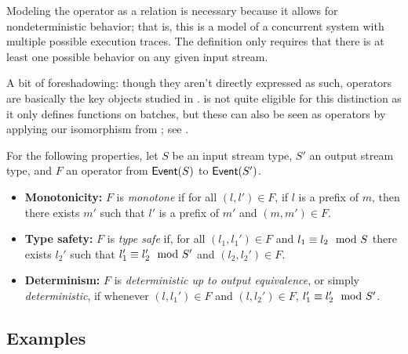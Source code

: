 Modeling the operator as a relation is necessary because it allows for nondeterministic behavior; that is, this is a model of a concurrent system with multiple possible execution traces. The definition only requires that there is at least one possible behavior on any given input stream.

A bit of foreshadowing: though they aren't directly expressed as such, operators are basically the key objects studied in .
 is not quite eligible for this distinction as it only defines functions on batches, but these can also be seen as operators by applying our isomorphism from ; see .

For the following properties, let $S$ be an input stream type, $S'$ an output stream type, and $F$ an operator from $\mathsf{Event}(S)$ to $\mathsf{Event}(S')$.
\begin{itemize}
  \item \textbf{Monotonicity:} $F$ is \emph{monotone}
  if for all $(l, l') \in F$, if $l$ is a prefix of $m$, then there
  exists $m'$ such that $l'$ is a prefix of $m'$ and $(m, m') \in F$.

  \item \textbf{Type safety:} $F$ is \emph{type safe} if, for all $(l_1, l_1') \in F$ and $l_1 \equiv l_2 \mod {S}$ there exists $l_2'$ such that $l_1' \equiv l_2' \mod {S'}$ and $(l_2, l_2') \in F$.

  \item \textbf{Determinism:} $F$ is \emph{deterministic up to output equivalence}, or simply \emph{deterministic}, if whenever $(l, l_1') \in F$ and $(l, l_2') \in F$, $l_1' \equiv l_2' \mod {S'}$.
\end{itemize}

\subsection{Examples}

